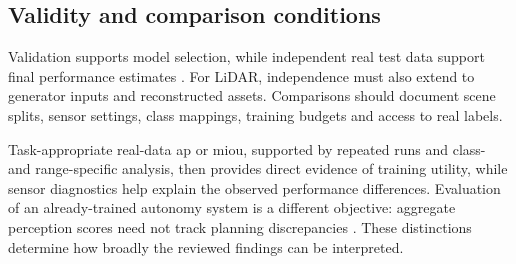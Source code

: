 \subsection{Validity and comparison conditions}

Validation supports model selection, while independent real test data
support final performance estimates
\parencite{raschkaModelEvaluationModel2020}.
For LiDAR, independence must also extend to generator inputs and
reconstructed assets. Comparisons should document scene splits, sensor
settings, class mappings, training budgets and access to real labels.

Task-appropriate real-data \gls{ap} or \gls{miou}, supported by repeated
runs and class- and range-specific analysis, then provides direct evidence
of training utility, while sensor diagnostics help explain the observed
performance differences.
Evaluation of an already-trained autonomy system is a different objective:
aggregate perception scores need not track planning discrepancies
\parencite{manivasagamZeroDomainGap2023}.
These distinctions determine how broadly the reviewed findings can be interpreted.
